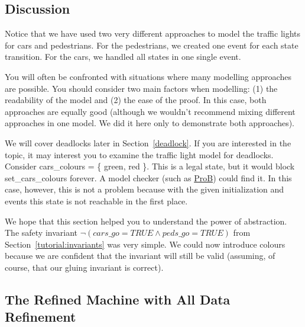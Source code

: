 
\subsection{Discussion}
\label{tut_concepts_discussion}

Notice that we have used two very different approaches to model the traffic lights for cars and pedestrians.  For the pedestrians, we created one event for each state transition.  For the cars, we handled all states in one single event.

You will often be confronted with situations where many modelling approaches are possible.  You should consider two main factors when modelling: (1) the readability of the model and (2) the ease of the proof.  In this case, both approaches are equally good (although we wouldn't recommend mixing different approaches in one model. We did it here only to demonstrate both approaches).

We will cover deadlocks later in Section~\ref{deadlock}.  If you are interested in the topic, it may interest you to examine the traffic light model for deadlocks.  Consider \textsf{cars\_colours = \{ green, red \}}. This is a legal state, but it would block \textsf{set\_cars\_colours} forever.  A model checker (such as \href{http://www.stups.uni-duesseldorf.de/ProB}{ProB}) could find it.  In this case, however, this is not a problem because with the given initialization and events this state is not reachable in the first place.

We hope that this section helped you to understand the power of abstraction.  The safety invariant
$\lnot(cars\_go = TRUE \land peds\_go = TRUE)$ from Section~\ref{tutorial:invariants} was very simple.  We could now introduce colours because we are confident that the invariant will still be valid (assuming, of course, that our gluing invariant is correct).

\subsection{The Refined Machine with All Data Refinement}
\label{tut_the_refined_machine_with_all_data_refinement}

